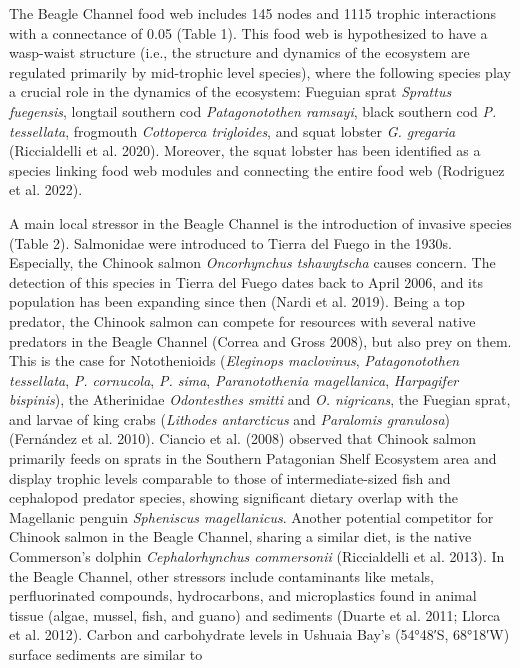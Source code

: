 \documentclass[
]{article}
\begin{document}
The Beagle Channel food web includes 145 nodes and 1115 trophic
interactions with a connectance of 0.05 (Table 1). This food web is
hypothesized to have a wasp-waist structure (i.e., the structure and
dynamics of the ecosystem are regulated primarily by mid-trophic level
species), where the following species play a crucial role in the
dynamics of the ecosystem: Fueguian sprat \emph{Sprattus fuegensis},
longtail southern cod \emph{Patagonotothen ramsayi}, black southern cod
\emph{P. tessellata}, frogmouth \emph{Cottoperca trigloides}, and squat
lobster \emph{G. gregaria} (Riccialdelli et al. 2020). Moreover, the
squat lobster has been identified as a species linking food web modules
and connecting the entire food web (Rodriguez et al. 2022).

A main local stressor in the Beagle Channel is the introduction of
invasive species (Table 2). Salmonidae were introduced to Tierra del
Fuego in the 1930s. Especially, the Chinook salmon \emph{Oncorhynchus
tshawytscha} causes concern. The detection of this species in Tierra del
Fuego dates back to April 2006, and its population has been expanding
since then (Nardi et al. 2019). Being a top predator, the Chinook salmon
can compete for resources with several native predators in the Beagle
Channel (Correa and Gross 2008), but also prey on them. This is the case
for Notothenioids (\emph{Eleginops maclovinus}, \emph{Patagonotothen
tessellata}, \emph{P. cornucola}, \emph{P. sima}, \emph{Paranotothenia
magellanica}, \emph{Harpagifer bispinis}), the Atherinidae
\emph{Odontesthes smitti} and \emph{O. nigricans}, the Fuegian sprat,
and larvae of king crabs (\emph{Lithodes antarcticus} and
\emph{Paralomis granulosa}) (Fernández et al. 2010). Ciancio et al.
(2008) observed that Chinook salmon primarily feeds on sprats in the
Southern Patagonian Shelf Ecosystem area and display trophic levels
comparable to those of intermediate-sized fish and cephalopod predator
species, showing significant dietary overlap with the Magellanic penguin
\emph{Spheniscus magellanicus}. Another potential competitor for Chinook
salmon in the Beagle Channel, sharing a similar diet, is the native
Commerson's dolphin \emph{Cephalorhynchus commersonii} (Riccialdelli et
al. 2013). In the Beagle Channel, other stressors include contaminants
like metals, perfluorinated compounds, hydrocarbons, and microplastics
found in animal tissue (algae, mussel, fish, and guano) and sediments
(Duarte et al. 2011; Llorca et al. 2012). Carbon and carbohydrate levels
in Ushuaia Bay's (54°48′S, 68°18′W) surface sediments are similar to
\end{document}
